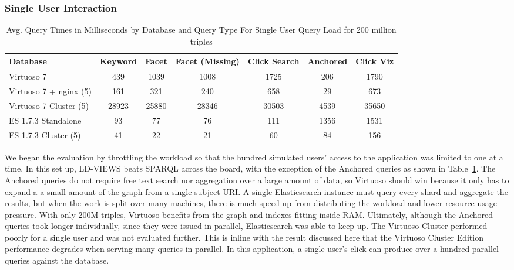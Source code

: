 \subsubsection{Single User Interaction}
 \begin{table}
 \centering
 \scriptsize{
    \begin{tabular}{ l||c|c|c|c|c|c }
        Database & Keyword & Facet & Facet (Missing) & Click Search & Anchored & Click Viz \\ \hline 
        Virtuoso 7 & 439 & 1039 & 1008 & 1725 & 206 &  1790 \\ 
        Virtuoso 7 + nginx (5) & 161 & 321 & 240 & 658 & 29 &  673 \\ 
        Virtuoso 7 Cluster (5) & 28923 & 25880 & 28346 & 30503 & 4539 & 35650\\
        ES 1.7.3 Standalone & 93 & 77 & 76 & 111 & 1356 & 1531 \\ 
        ES 1.7.3 Cluster (5) & 41 & 22 & 21 & 60 & 84 & 156 \\ 
    \end{tabular} 
    }
    \centering
    \caption{Avg. Query Times in Milliseconds by Database and Query Type For Single User Query Load for 200 million triples}
    \label{table:qt_single_user_200m}
    \vspace{-0.2cm}
\end{table}
We began the evaluation by throttling the workload so that the hundred simulated users' access to the application was limited to one at a time.
In this set up, LD-VIEWS beats SPARQL across the board, with the exception of the Anchored queries as shown in Table~\ref{table:qt_single_user_200m}.  
The Anchored queries do not require free text search nor aggregation over a large amount of data, so Virtuoso should win because it only has to expand a a small amount of the graph from a single subject URI.
A single Elasticsearch instance must query every shard and aggregate the results, but when the work is split over many machines, there is much speed up from distributing the workload and lower resource usage pressure.   
With only 200M triples, Virtuoso benefits from the graph and indexes fitting inside RAM.
Ultimately, although the Anchored queries took longer individually, since they were issued in parallel, Elasticsearch was able to keep up.
The Virtuoso Cluster performed poorly for a single user and was not evaluated further. 
This is inline with the result discussed here \cite{harthlinked} that the Virtuoso Cluster Edition performance degrades when serving many queries in parallel.  
In this application, a single user's click can produce over a hundred parallel queries against the database. 

